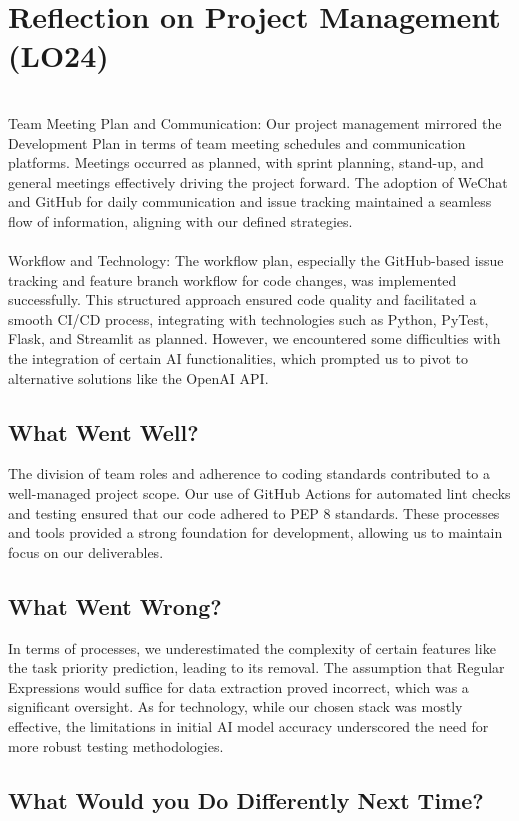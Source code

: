 \documentclass{article}
\begin{document}
\section{Reflection on Project Management (LO24)}
\\
Team Meeting Plan and Communication:
Our project management mirrored the Development Plan in terms of team meeting schedules and communication platforms. Meetings occurred as planned, with sprint planning, stand-up, and general meetings effectively driving the project forward. The adoption of WeChat and GitHub for daily communication and issue tracking maintained a seamless flow of information, aligning with our defined strategies.
\\
\\
Workflow and Technology:
The workflow plan, especially the GitHub-based issue tracking and feature branch workflow for code changes, was implemented successfully. This structured approach ensured code quality and facilitated a smooth CI/CD process, integrating with technologies such as Python, PyTest, Flask, and Streamlit as planned. However, we encountered some difficulties with the integration of certain AI functionalities, which prompted us to pivot to alternative solutions like the OpenAI API.

\subsection{What Went Well?}
The division of team roles and adherence to coding standards contributed to a well-managed project scope. Our use of GitHub Actions for automated lint checks and testing ensured that our code adhered to PEP 8 standards. These processes and tools provided a strong foundation for development, allowing us to maintain focus on our deliverables.

\subsection{What Went Wrong?}
In terms of processes, we underestimated the complexity of certain features like the task priority prediction, leading to its removal. The assumption that Regular Expressions would suffice for data extraction proved incorrect, which was a significant oversight. As for technology, while our chosen stack was mostly effective, the limitations in initial AI model accuracy underscored the need for more robust testing methodologies.
\subsection{What Would you Do Differently Next Time?}
\end{document}
